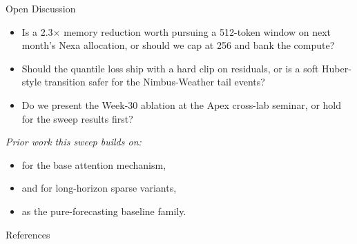 \begin{frame}{Open Discussion}

\begin{itemize}[leftmargin=1.3em,itemsep=10pt]
  \item Is a 2.3$\times$ memory reduction worth pursuing a 512-token window on next month's
        Nexa allocation, or should we cap at 256 and bank the compute?
  \item Should the quantile loss ship with a hard clip on residuals, or is a soft
        Huber-style transition safer for the Nimbus-Weather tail events?
  \item Do we present the Week-30 ablation at the Apex cross-lab seminar, or hold for
        the sweep results first?
\end{itemize}

\vspace{0.5cm}
{\small\color{inkNavy!60!white}\textit{Prior work this sweep builds on:}}
\begin{itemize}[leftmargin=1.3em,itemsep=2pt]
  \small
  \item \citep{vaswani2017attention} for the base attention mechanism,
  \item \citep{zhou2021informer} and \citep{nie2023patchtst} for long-horizon sparse variants,
  \item \citep{oreshkin2020nbeats} as the pure-forecasting baseline family.
\end{itemize}

\end{frame}

\begin{frame}[allowframebreaks]{References}
\small


\end{frame}
